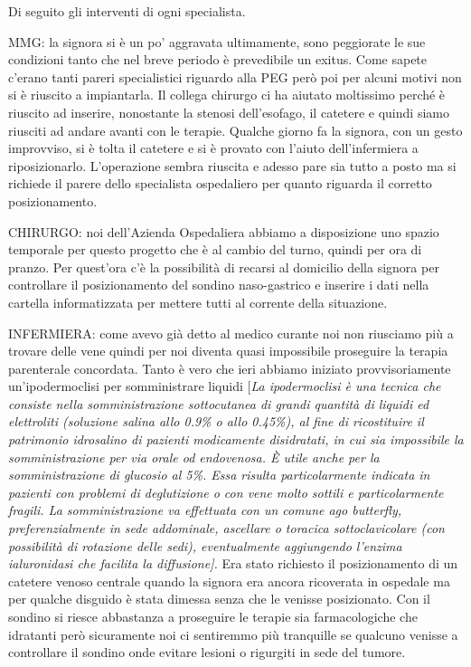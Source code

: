\documentclass[]{article}
\begin{document}
Di seguito gli interventi di ogni specialista.

MMG: la signora si è un po' aggravata ultimamente, sono peggiorate le
sue condizioni tanto che nel breve periodo è prevedibile un exitus. Come
sapete c'erano tanti pareri specialistici riguardo alla PEG però poi per
alcuni motivi non si è riuscito a impiantarla. Il collega chirurgo ci ha
aiutato moltissimo perché è riuscito ad inserire, nonostante la stenosi
dell'esofago, il catetere e quindi siamo riusciti ad andare avanti con
le terapie. Qualche giorno fa la signora, con un gesto improvviso, si è
tolta il catetere e si è provato con l'aiuto dell'infermiera a
riposizionarlo. L'operazione sembra riuscita e adesso pare sia tutto a
posto ma si richiede il parere dello specialista ospedaliero per quanto
riguarda il corretto posizionamento.

CHIRURGO: noi dell'Azienda Ospedaliera abbiamo a disposizione uno spazio
temporale per questo progetto che è al cambio del turno, quindi per ora
di pranzo. Per quest'ora c'è la possibilità di recarsi al domicilio
della signora per controllare il posizionamento del sondino
naso-gastrico e inserire i dati nella cartella informatizzata per
mettere tutti al corrente della situazione.

INFERMIERA: come avevo già detto al medico curante noi non riusciamo più
a trovare delle vene quindi per noi diventa quasi impossibile proseguire
la terapia parenterale concordata. Tanto è vero che ieri abbiamo
iniziato provvisoriamente un'ipodermoclisi per somministrare liquidi
{[}\emph{La ipodermoclisi è una tecnica che consiste nella
somministrazione sottocutanea di grandi quantità di liquidi ed
elettroliti (soluzione salina allo 0.9\% o allo 0.45\%), al fine di
ricostituire il patrimonio idrosalino di pazienti modicamente
disidratati, in cui sia impossibile la somministrazione per via orale od
endovenosa. È utile anche per la somministrazione di glucosio al 5\%.
Essa risulta particolarmente indicata in pazienti con problemi di
deglutizione o con vene molto sottili e particolarmente fragili. La
somministrazione va effettuata con un comune ago butterfly,
preferenzialmente in sede addominale, ascellare o toracica
sottoclavicolare (con possibilità di rotazione delle sedi),
eventualmente aggiungendo l'enzima ialuronidasi che facilita la
diffusione{]}.} Era stato richiesto il posizionamento di un catetere
venoso centrale quando la signora era ancora ricoverata in ospedale ma
per qualche disguido è stata dimessa senza che le venisse posizionato.
Con il sondino si riesce abbastanza a proseguire le terapie sia
farmacologiche che idratanti però sicuramente noi ci sentiremmo più
tranquille se qualcuno venisse a controllare il sondino onde evitare
lesioni o rigurgiti in sede del tumore.
\end{document}

